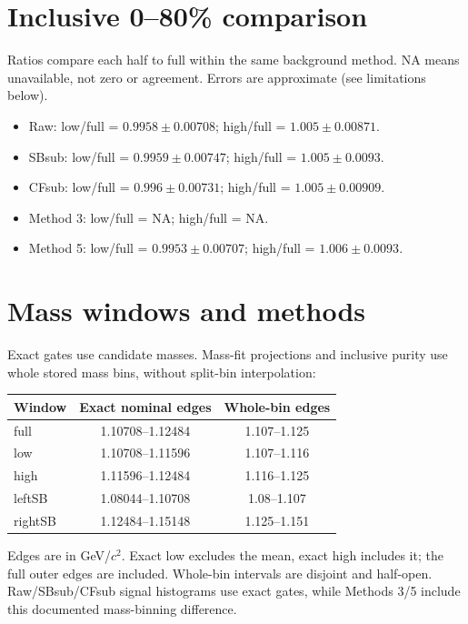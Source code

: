 \documentclass[10pt,a4paper]{article}
\begin{document}
\section{Inclusive 0--80\% comparison}
Ratios compare each half to full within the same background method. NA means unavailable, not zero or agreement. Errors are approximate (see limitations below).
\begin{itemize}
\item Raw: low/full = $0.9958\pm0.00708$; high/full = $1.005\pm0.00871$.
\item SBsub: low/full = $0.9959\pm0.00747$; high/full = $1.005\pm0.0093$.
\item CFsub: low/full = $0.996\pm0.00731$; high/full = $1.005\pm0.00909$.
\item Method 3: low/full = NA; high/full = NA.
\item Method 5: low/full = $0.9953\pm0.00707$; high/full = $1.006\pm0.0093$.
\end{itemize}\section{Mass windows and methods}
Exact gates use candidate masses. Mass-fit projections and inclusive purity use whole stored mass bins, without split-bin interpolation:
\begin{center}\begin{tabular}{lcc}\hline Window & Exact nominal edges & Whole-bin edges\\\hline
full & 1.10708--1.12484 & 1.107--1.125\\
low & 1.10708--1.11596 & 1.107--1.116\\
high & 1.11596--1.12484 & 1.116--1.125\\
leftSB & 1.08044--1.10708 & 1.08--1.107\\
rightSB & 1.12484--1.15148 & 1.125--1.151\\
\hline\end{tabular}\end{center}
Edges are in GeV/$c^2$. Exact low excludes the mean, exact high includes it; the full outer edges are included. Whole-bin intervals are disjoint and half-open. Raw/SBsub/CFsub signal histograms use exact gates, while Methods 3/5 include this documented mass-binning difference.
\end{document}
